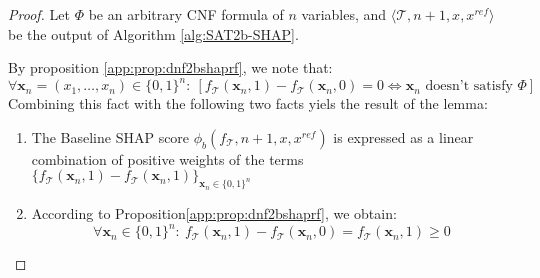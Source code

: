 \begin{proof}
            Let $\Phi$ be an arbitrary CNF formula of $n$ variables, and $\langle \mathcal{T}, n+1, x, x^{ref} \rangle$ be the output of Algorithm \ref{alg:SAT2b-SHAP}. 

    By proposition \ref{app:prop:dnf2bshaprf}, we note that: 
    $$\forall  \mathbf{x}_{n} = (x_1, \ldots, x_n) \in \{0,1\}^{n}: ~ \left[ f_{\mathcal{T}}(\mathbf{x}_{n}, 1) - f_{\mathcal{T}}(\mathbf{x}_{n}, 0) = 0 \iff \mathbf{x}_{n} \text{ doesn't satisfy } \Phi \right] $$
    Combining this fact with the following two facts yiels the result of the lemma:
    \begin{enumerate}
     \item The Baseline SHAP score $\phi_{b}(f_{\mathcal{T}}, n+1, x, x^{ref})$ is expressed as a linear combination of positive weights of the terms $\{f_{\mathcal{T}}(\mathbf{x}_{n},1) - f_{\mathcal{T}}(\mathbf{x}_{n},1) \}_{\mathbf{x}_{n} \in \{0,1\}^{n} }$
     \item According to Proposition\ref{app:prop:dnf2bshaprf}, we obtain:
     $$\forall \mathbf{x}_{n} \in \{0,1 \}^{n} :~f_{\mathcal{T}}(\mathbf{x}_{n}, 1) - f_{\mathcal{T}}(\mathbf{x}_{n}, 0) = f_{\mathcal{T}}(\mathbf{x}_{n}, 1) \geq 0$$
     \end{enumerate}
     
\end{proof}
